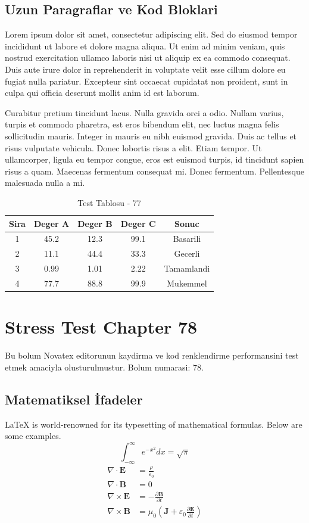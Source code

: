 \documentclass[12pt,a4paper]{article}
\begin{document}
\subsection{Uzun Paragraflar ve Kod Bloklari}
Lorem ipsum dolor sit amet, consectetur adipiscing elit. Sed do eiusmod tempor incididunt ut labore et dolore magna aliqua. Ut enim ad minim veniam, quis nostrud exercitation ullamco laboris nisi ut aliquip ex ea commodo consequat. Duis aute irure dolor in reprehenderit in voluptate velit esse cillum dolore eu fugiat nulla pariatur. Excepteur sint occaecat cupidatat non proident, sunt in culpa qui officia deserunt mollit anim id est laborum.

Curabitur pretium tincidunt lacus. Nulla gravida orci a odio. Nullam varius, turpis et commodo pharetra, est eros bibendum elit, nec luctus magna felis sollicitudin mauris. Integer in mauris eu nibh euismod gravida. Duis ac tellus et risus vulputate vehicula. Donec lobortis risus a elit. Etiam tempor. Ut ullamcorper, ligula eu tempor congue, eros est euismod turpis, id tincidunt sapien risus a quam. Maecenas fermentum consequat mi. Donec fermentum. Pellentesque malesuada nulla a mi.

\begin{table}[h!]
\centering
\begin{tabular}{|c|c|c|c|c|}
\hline
\textbf{Sira} & \textbf{Deger A} & \textbf{Deger B} & \textbf{Deger C} & \textbf{Sonuc} \\
\hline
1 & 45.2 & 12.3 & 99.1 & Basarili \\
2 & 11.1 & 44.4 & 33.3 & Gecerli \\
3 & 0.99 & 1.01 & 2.22 & Tamamlandi \\
4 & 77.7 & 88.8 & 99.9 & Mukemmel \\
\hline
\end{tabular}
\caption{Test Tablosu - 77}
\end{table}

\newpage
\section{Stress Test Chapter 78}
Bu bolum Novatex editorunun kaydirma ve kod renklendirme performansini test etmek amaciyla olusturulmustur. Bolum numarasi: 78.

\subsection{Matematiksel İfadeler}
\LaTeX{} is world-renowned for its typesetting of mathematical formulas. Below are some examples.
\begin{equation}
\int_{-\infty}^{\infty} e^{-x^2} dx = \sqrt{\pi}
\end{equation}
\begin{align}
\nabla \cdot \mathbf{E} &= \frac{\rho}{\varepsilon_0} \\
\nabla \cdot \mathbf{B} &= 0 \\
\nabla \times \mathbf{E} &= -\frac{\partial \mathbf{B}}{\partial t} \\
\nabla \times \mathbf{B} &= \mu_0\left(\mathbf{J} + \varepsilon_0 \frac{\partial \mathbf{E}}{\partial t}\right)
\end{align}
\end{document}
